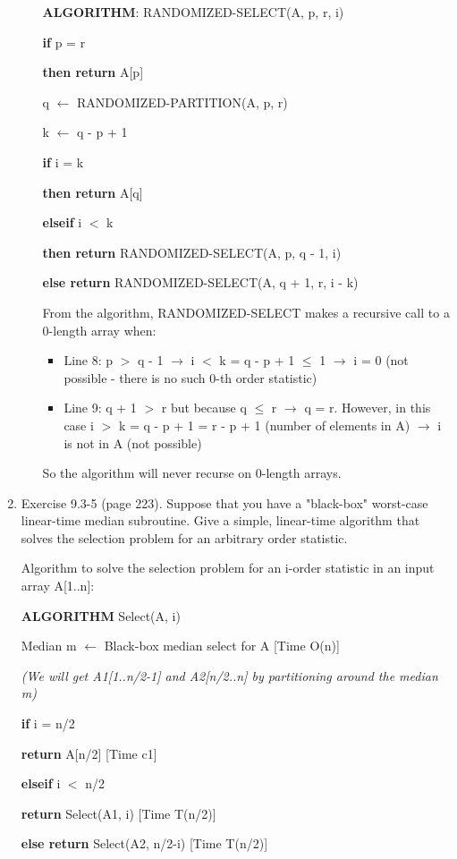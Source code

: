\documentclass[11pts]{report}
\begin{document}
\begin{enumerate}
\begin{enumerate}
\par \textbf{ALGORITHM}: RANDOMIZED-SELECT(A, p, r, i)
\par \textbf{if} p = r
\par \quad \textbf{then return} A[p]
\par q $\gets$ RANDOMIZED-PARTITION(A, p, r)
\par k $\gets$ q - p + 1
\par \textbf{if} i = k
\par \quad \textbf{then return } A[q]
\par \textbf{elseif} i $<$ k
\par \quad \textbf{then return} RANDOMIZED-SELECT(A, p, q - 1, i)
\par \textbf{else return} RANDOMIZED-SELECT(A, q + 1, r, i - k)

\par From the algorithm, RANDOMIZED-SELECT makes a recursive call to a 0-length array when:
\begin{itemize}
\item Line 8: p $>$ q - 1 $\to$ i $<$ k = q - p + 1 $\leq$ 1 $\to$ i = 0 (not possible - there is no such 0-th order statistic) 
\item Line 9: q + 1 $>$ r but because q $\leq$ r $\to$ q = r. However, in this case i $>$ k = q - p + 1 = r - p + 1 (number of elements in A) $\to$ i is not in A (not possible)
\end{itemize}
\par So the algorithm will never recurse on 0-length arrays.

\end{enumerate}

\item Exercise 9.3-5 (page 223). Suppose that you have a "black-box" worst-case linear-time median subroutine. Give a simple, linear-time algorithm that solves the selection problem for an arbitrary order statistic.
\par Algorithm to solve the selection problem for an i-order statistic in an input array A[1..n]:
\par \textbf{ALGORITHM} Select(A, i)
\par Median m $\gets$ Black-box median select for A [Time O(n)]
\par \textit{(We will get A1[1..n/2-1] and A2[n/2..n] by partitioning around the median m)}
\par \textbf{if} i = n/2 
\par \quad \textbf{return} A[n/2] [Time c1]
\par \textbf{elseif} i $<$ n/2
\par \quad \textbf{return} Select(A1, i) [Time T(n/2)]
\par \textbf{else return} Select(A2, n/2-i)  [Time T(n/2)]


\end{enumerate}
\end{document}
